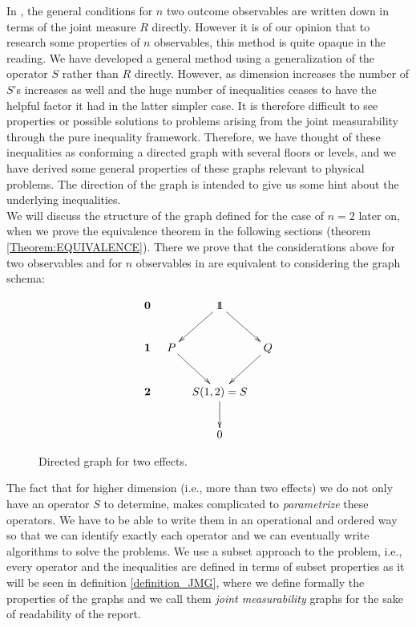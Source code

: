 \documentclass[10pt, a4paper]{amsart}
\begin{document}
In \cite{wolfgarcia}, the general conditions for $n$ two outcome observables are written down in terms of the joint measure $R$ directly. However it is of our opinion that to research some properties of $n$ observables, this method is quite opaque in the reading. We have developed a general method using a generalization of the operator $S$ rather than $R$ directly. However, as dimension increases the number of $S$'s increases as well and the huge number of inequalities ceases to have the helpful factor it had in the latter simpler case. It is therefore difficult to see properties or possible solutions to problems arising from the joint measurability through the pure inequality framework. Therefore, we have thought of these inequalities as conforming a directed graph with several floors or levels, and we have derived some general properties of these graphs relevant to physical problems. The direction of the graph is intended to give us some hint about the underlying inequalities.     \\ 

We will discuss the structure of the graph defined for the case of $n= 2$ later on, when we prove the equivalence theorem in the following sections (theorem \ref{Theorem:EQUIVALENCE}). There we prove that the considerations above for two observables and for $n$ observables in \cite{wolfgarcia} are equivalent to considering the graph schema: 
\begin{figure}[h]
$$
\xymatrix@ C = 3mm{
\mathbf{0}&&\bbone\ar[dl]\ar[dr]&\\
\mathbf{1}&P\ar[dr]&&Q\ar[dl]\\
\mathbf{2}&&S(1,2) = S\ar[d]&\\
&&0
}
$$
\caption{Directed graph for two effects.}
\label{Fig:2Effects_Intro}
\end{figure}


The fact that for higher dimension (i.e., more than two effects) we do not only have an operator $S$ to determine, makes complicated to \textit{parametrize} these operators. We have to be able to write them in an operational and ordered way  so that we can identify exactly each operator and we can eventually write algorithms to solve the problems. We use a subset approach to the problem, i.e., every operator and the inequalities are defined in terms of subset properties as it will be seen in definition \ref{definition_JMG}, where we define formally the properties of the graphs and we call them \textit{joint measurability} graphs for the sake of readability of the report. 
\end{document}
